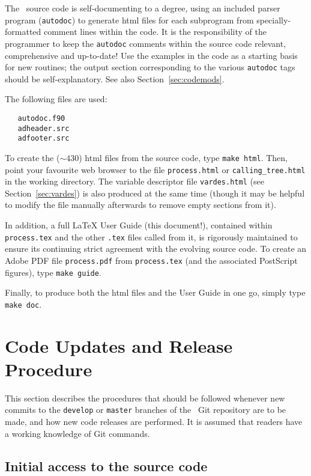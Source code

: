 The \process\ source code is self-documenting to a degree, using an included
parser program (\texttt{autodoc}) to generate html files for each subprogram
from specially-formatted comment lines within the code. It is the
responsibility of the programmer to keep the \texttt{autodoc} comments within
the source code relevant, comprehensive and up-to-date! Use the examples in
the code as a starting basis for new routines; the output section
corresponding to the various \texttt{autodoc} tags should be
self-explanatory. See also Section~\ref{sec:codemods}.

The following files are used:
\begin{verbatim}
   autodoc.f90
   adheader.src
   adfooter.src
\end{verbatim}
To create the ($\sim 430$) html files from the source code, type
\verb+make html+.  Then, point your favourite web browser to the file
\texttt{process.html} or \texttt{calling\_tree.html} in the working
directory. The variable descriptor file \texttt{vardes.html} (see
Section~\ref{sec:vardes}) is also produced at the same time (though it may be
helpful to modify the file manually afterwards to remove empty sections from
it).

In addition, a full \LaTeX\/ User Guide (this document!), contained within
\texttt{process.tex} and the other \texttt{.tex} files called from it, is
rigorously maintained to ensure its continuing strict agreement with the
evolving source code. To create an Adobe PDF file \texttt{process.pdf} from
\texttt{process.tex} (and the associated PostScript figures), type
\verb+make guide+.

Finally, to produce both the html files and the User Guide in one go, simply
type \verb+make doc+.

\section{Code Updates and Release Procedure}
\label{sec:code_release}

This section describes the procedures that should be followed whenever new
commits to the \texttt{develop} or \texttt{master} branches of the \process\
Git repository are to be made, and how new code releases are performed. It is
assumed that readers have a working knowledge of Git commands.

\subsection{Initial access to the source code}
\label{sec:getsource}


